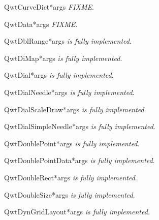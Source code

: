 \documentclass{manual}
\begin{document}
\begin{classdesc}{QwtCurveDict}{*args}
\emph{FIXME}.
\end{classdesc}

\begin{classdesc}{QwtData}{*args}
\emph{FIXME}.
\end{classdesc}

\begin{classdesc}{QwtDblRange}{*args}
\emph{is fully implemented}.
\end{classdesc}

\begin{classdesc}{QwtDiMap}{*args}
\emph{is fully implemented}.
\end{classdesc}

\begin{classdesc}{QwtDial}{*args}
\emph{is fully implemented}.
\end{classdesc}

\begin{classdesc}{QwtDialNeedle}{*args}
\emph{is fully implemented}.
\end{classdesc}

\begin{classdesc}{QwtDialScaleDraw}{*args}
\emph{is fully implemented}.
\end{classdesc}

\begin{classdesc}{QwtDialSimpleNeedle}{*args}
\emph{is fully implemented}.
\end{classdesc}

\begin{classdesc}{QwtDoublePoint}{*args}
\emph{is fully implemented}.
\end{classdesc}

\begin{classdesc}{QwtDoublePointData}{*args}
\emph{is fully implemented}.
\end{classdesc}

\begin{classdesc}{QwtDoubleRect}{*args}
\emph{is fully implemented}.
\end{classdesc}

\begin{classdesc}{QwtDoubleSize}{*args}
\emph{is fully implemented}.
\end{classdesc}

\begin{classdesc}{QwtDynGridLayout}{*args}
\emph{is fully implemented}.
\end{classdesc}
\end{document}
